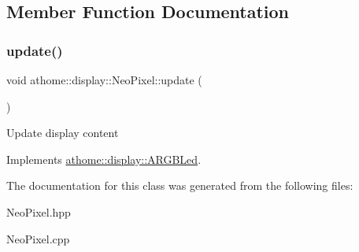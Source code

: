 \subsection{Member Function Documentation}
\mbox{\label{classathome_1_1display_1_1_neo_pixel_a272bca4da78dff7dc02bcd023665e013}} 
\subsubsection{\texorpdfstring{update()}{update()}}
{\footnotesize\ttfamily void athome\+::display\+::\+Neo\+Pixel\+::update (\begin{DoxyParamCaption}{ }\end{DoxyParamCaption})\hspace{0.3cm}{\ttfamily [virtual]}}

Update display content 

Implements \mbox{\hyperlink{classathome_1_1display_1_1_a_r_g_b_led_a725ceca0c01735daa9c95148baf075ab}{athome\+::display\+::\+A\+R\+G\+B\+Led}}.



The documentation for this class was generated from the following files\+:\begin{DoxyCompactItemize}
\item 
Neo\+Pixel.\+hpp\item 
Neo\+Pixel.\+cpp\end{DoxyCompactItemize}
